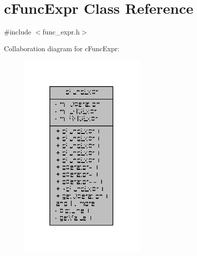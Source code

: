 \hypertarget{classcFuncExpr}{\section{c\-Func\-Expr Class Reference}
\label{classcFuncExpr}
}


{\ttfamily \#include $<$func\-\_\-expr.\-h$>$}



Collaboration diagram for c\-Func\-Expr\-:
\nopagebreak
\begin{figure}[H]
\begin{center}
\leavevmode
\includegraphics[width=176pt]{classcFuncExpr__coll__graph}
\end{center}
\end{figure}
